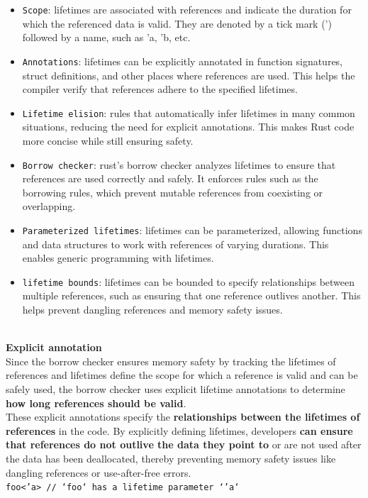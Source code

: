 \documentclass{article}
\begin{document}
\begin{itemize}
    \item \texttt{Scope}: lifetimes are associated with references and indicate the duration for which the referenced data is valid. They are denoted by a tick mark (') followed by a name, such as 'a, 'b, etc.
    \item \texttt{Annotations}: lifetimes can be explicitly annotated in function signatures, struct definitions, and other places where references are used. This helps the compiler verify that references adhere to the specified lifetimes.
    \item \texttt{Lifetime elision}: rules that automatically infer lifetimes in many common situations, reducing the need for explicit annotations. This makes Rust code more concise while still ensuring safety.
    \item \texttt{Borrow checker}: rust's borrow checker analyzes lifetimes to ensure that references are used correctly and safely. It enforces rules such as the borrowing rules, which prevent mutable references from coexisting or overlapping.
    \item \texttt{Parameterized lifetimes}: lifetimes can be parameterized, allowing functions and data structures to work with references of varying durations. This enables generic programming with lifetimes.
    \item \texttt{lifetime bounds}: lifetimes can be bounded to specify relationships between multiple references, such as ensuring that one reference outlives another. This helps prevent dangling references and memory safety issues.
\end{itemize}
\\
\textbf{Explicit annotation}
\\Since the borrow checker ensures memory safety by tracking the lifetimes of references and lifetimes define the scope for which a reference is valid and can be safely used, the borrow checker uses explicit lifetime annotations to determine \textbf{how long references should be valid}.
\\
These explicit annotations specify the \textbf{relationships between the lifetimes of references} in the code. By explicitly defining lifetimes, developers \textbf{can ensure that references do not outlive the data they point to} or are not used after the data has been deallocated, thereby preventing memory safety issues like dangling references or use-after-free errors.
\\
\texttt{foo<'a> // `foo` has a lifetime parameter `'a`}
\end{document}
